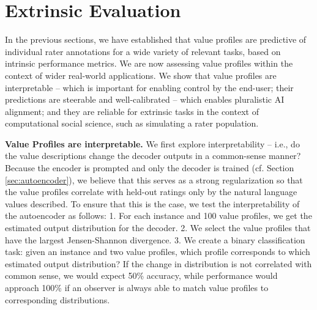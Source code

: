 \documentclass[11pt]{article}
\begin{document}
\section{Extrinsic Evaluation}
\label{sec:extrinsicevaluation}

In the previous sections, we have established that value profiles are predictive of individual rater annotations for a wide variety of relevant tasks, based on intrinsic performance metrics. 
We are now assessing value profiles within the context of wider real-world applications. We show that value profiles are interpretable -- which is important for enabling control by the end-user; their predictions are steerable and well-calibrated -- which enables pluralistic AI alignment; and they are reliable for extrinsic tasks in the context of computational social science, such as simulating a rater population.

\textbf{Value Profiles are interpretable.}\label{sec:interpretability}
We first explore interpretability --
i.e.,
do the value descriptions change the decoder outputs in a common-sense manner? Because the encoder is prompted and only the decoder is trained (cf. Section \ref{sec:autoencoder}), we believe that this serves as a strong regularization so that the value profiles correlate with held-out ratings only by the natural language
values described. To ensure that this is the case, we test the interpretability of the autoencoder as follows:
1. For each instance and 100 value profiles, we get the estimated output distribution for the decoder.
2. We select the value profiles that have the largest Jensen-Shannon divergence.
3. We create
a
binary classification task: given an instance and two value profiles, which profile corresponds to which estimated output distribution?
If the change in distribution is not correlated with common sense, we would expect 50\% accuracy, while performance would approach 100\% if an observer is always able to
match value profiles to corresponding distributions.
\end{document}
